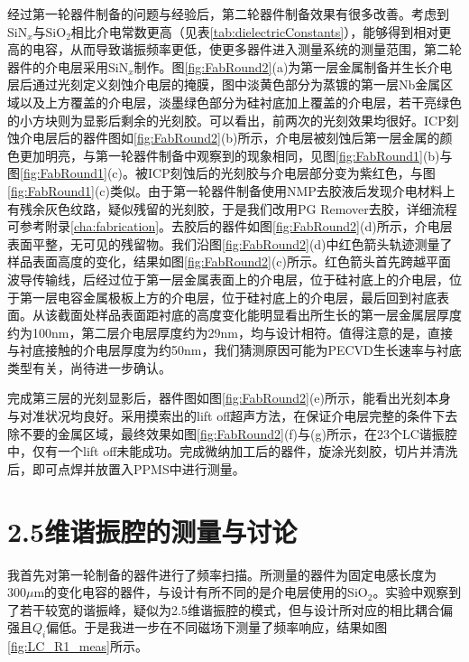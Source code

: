             经过第一轮器件制备的问题与经验后，第二轮器件制备效果有很多改善。考虑到SiN$_x$与SiO$_2$相比介电常数更高（见表\ref{tab:dielectricConstants}），能够得到相对更高的电容，从而导致谐振频率更低，使更多器件进入测量系统的测量范围，第二轮器件的介电层采用SiN$_x$制作。图\ref{fig:FabRound2}(a)为第一层金属制备并生长介电层后通过光刻定义刻蚀介电层的掩膜，图中淡黄色部分为蒸镀的第一层Nb金属区域以及上方覆盖的介电层，淡墨绿色部分为硅衬底加上覆盖的介电层，若干亮绿色的小方块则为显影后剩余的光刻胶。可以看出，前两次的光刻效果均很好。ICP刻蚀介电层后的器件图如\ref{fig:FabRound2}(b)所示，介电层被刻蚀后第一层金属的颜色更加明亮，与第一轮器件制备中观察到的现象相同，见图\ref{fig:FabRound1}(b)与图\ref{fig:FabRound1}(c)。被ICP刻蚀后的光刻胶与介电层部分变为紫红色，与图\ref{fig:FabRound1}(c)类似。由于第一轮器件制备使用NMP去胶液后发现介电材料上有残余灰色纹路，疑似残留的光刻胶，于是我们改用PG Remover去胶，详细流程可参考附录\ref{cha:fabrication}。去胶后的器件如图\ref{fig:FabRound2}(d)所示，介电层表面平整，无可见的残留物。我们沿图\ref{fig:FabRound2}(d)中红色箭头轨迹测量了样品表面高度的变化，结果如图\ref{fig:FabRound2}(c)所示。红色箭头首先跨越平面波导传输线，后经过位于第一层金属表面上的介电层，位于硅衬底上的介电层，位于第一层电容金属极板上方的介电层，位于硅衬底上的介电层，最后回到衬底表面。从该截面处样品表面距衬底的高度变化能明显看出所生长的第一层金属层厚度约为100nm，第二层介电层厚度约为29nm，均与设计相符。值得注意的是，直接与衬底接触的介电层厚度为约50nm，我们猜测原因可能为PECVD生长速率与衬底类型有关，尚待进一步确认。

            完成第三层的光刻显影后，器件图如图\ref{fig:FabRound2}(e)所示，能看出光刻本身与对准状况均良好。采用摸索出的lift off超声方法，在保证介电层完整的条件下去除不要的金属区域，最终效果如图\ref{fig:FabRound2}(f)与(g)所示，在23个LC谐振腔中，仅有一个lift off未能成功。完成微纳加工后的器件，旋涂光刻胶，切片并清洗后，即可点焊并放置入PPMS中进行测量。



            



            \section{2.5维谐振腔的测量与讨论} %
            \label{sec:2.5维谐振腔的测量与讨论}
            	

            我首先对第一轮制备的器件进行了频率扫描。所测量的器件为固定电感长度为$300\mu$m的变化电容的器件，与设计有所不同的是介电层使用的SiO$_2$。实验中观察到了若干较宽的谐振峰，疑似为2.5维谐振腔的模式，但与设计所对应的相比耦合偏强且$Q_i$偏低。于是我进一步在不同磁场下测量了频率响应，结果如图\ref{fig:LC_R1_meas}所示。


